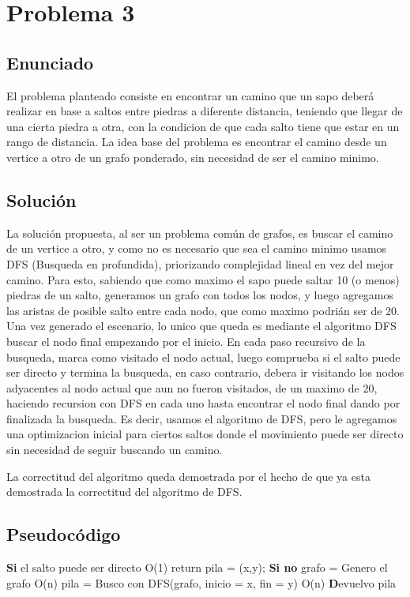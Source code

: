 \section{Problema 3}

\subsection{Enunciado}
El problema planteado consiste en encontrar un camino que un sapo deberá realizar en base a saltos entre piedras a diferente distancia, teniendo que llegar de una cierta piedra a otra, con la condicion de que cada salto tiene que estar en un rango de distancia.
La idea base del problema es encontrar el camino desde un vertice a otro de un grafo ponderado, sin necesidad de ser el camino minimo. 

\subsection{Soluci\'on}
La solución propuesta, al ser un problema común de grafos, es buscar el camino de un vertice a otro, y como no es necesario que sea el camino minimo usamos DFS (Busqueda en profundida), priorizando complejidad lineal en vez del mejor camino. Para esto, sabiendo que como maximo el sapo puede saltar 10 (o menos) piedras de un salto, generamos un grafo con todos los nodos, y luego agregamos las aristas de posible salto entre cada nodo, que como maximo podrián ser de 20.
Una vez generado el escenario, lo unico que queda es mediante el algoritmo DFS buscar el nodo final empezando por el inicio. 
En cada paso recursivo de la busqueda, marca como visitado el nodo actual, luego comprueba si el salto puede ser directo y termina la busqueda, en caso contrario, debera ir visitando los nodos adyacentes al nodo actual que aun no fueron visitados, de un maximo de 20, haciendo recursion con DFS en cada uno hasta encontrar el nodo final dando por finalizada la busqueda.
Es decir, usamos el algoritmo de DFS, pero le agregamos una optimizacion inicial para ciertos saltos donde el movimiento puede ser directo sin necesidad de seguir buscando un camino.

La correctitud del algoritmo queda demostrada por el hecho de que ya esta demostrada la correctitud del algoritmo de DFS.

\subsection{Pseudoc\'odigo}
\begin{codebox}
\li	\textbf{Si} el salto puede ser directo \Do \RComment O(1)
\li		return pila = (x,y); \End
\li	\textbf{Si no}  \Do
\li		grafo = Genero el grafo 				\RComment O(n)
\li		pila = Busco con DFS(grafo, inicio = x, fin = y)	\RComment O(n)\End 
\li	\textbf Devuelvo pila
\end{codebox}

